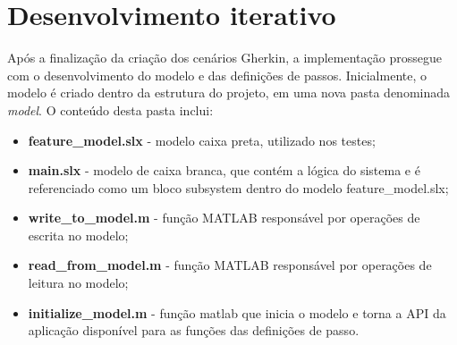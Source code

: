 

\section{Desenvolvimento iterativo}

Após a finalização da criação dos cenários Gherkin, a implementação prossegue com o desenvolvimento do modelo e das definições de passos. Inicialmente, o modelo é 
criado dentro da estrutura do projeto, em uma nova pasta denominada \textit{model}. O conteúdo desta pasta inclui:

\begin{itemize}
	\item \textbf{feature\_model.slx} - modelo caixa preta, utilizado nos testes;
	\item \textbf{main.slx} - modelo de caixa branca, que contém a lógica do sistema e é referenciado como um bloco subsystem dentro do modelo feature\_model.slx;
	\item \textbf{write\_to\_model.m} - função MATLAB responsável por operações de escrita no modelo;
	\item \textbf{read\_from\_model.m} - função MATLAB responsável por operações de leitura no modelo;
	\item \textbf{initialize\_model.m} - função matlab que inicia o modelo e torna a API da aplicação disponível para as funções das definições de passo.
\end{itemize}

